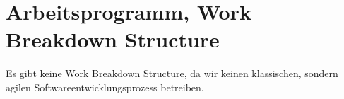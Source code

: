 
\section{Arbeitsprogramm, Work Breakdown Structure}

Es gibt keine Work Breakdown Structure, da wir keinen klassischen, sondern 
agilen Softwareentwicklungsprozess betreiben.
